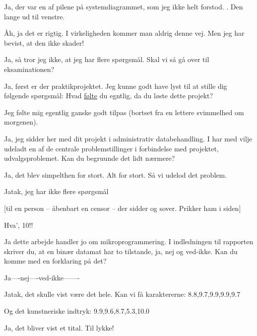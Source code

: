 \documentclass[a4paper,11pt]{article}
\begin{document}
\begin{sketch}
 Ja, der var en af pilene på systemdiagrammet, som jeg ikke helt
forstod. . Den lange ud til venstre.

 Åh, ja det er rigtig. I virkeligheden kommer man aldrig denne vej. Men
jeg har bevist, at den ikke skader!

 Ja, så tror jeg ikke, at jeg har flere spørgsmål. Skal vi så gå over
til eksaminationen?

 Ja, først er der praktikprojektet. Jeg kunne godt have lyst til at
stille dig følgende spørgsmål: Hvad \underline{følte} du egntlig, da du løste
dette projekt?

 Jeg følte mig egentlig ganske godt tilpas (bortset fra en lettere
svimmelhed om morgenen).

 Ja, jeg sidder her med dit projekt i administrativ databehandling. I
har med vilje udeladt en af de centrale problemstillinger i forbindelse med
projektet, udvalgsproblemet. Kan du begruunde det lidt nærmere?

 Ja, det blev simpelthen for stort. Alt for stort. Så vi udelod det
problem.

 Jatak, jeg har ikke flere spørgsmål

[til en person -- åbenbart en censor -- der sidder og sover. Prikker ham
i siden]

 Hva', 10!! 

 Ja dette arbejde handler jo om mikroprogrammering. I indledningen til
rapporten skriver du, at en binær datamat har to tilstande, ja, nej og
ved-ikke. Kan du komme med en forklaring på det?

 Ja----nej----ved-ikke-------

 Jatak, det skulle vist være det hele. Kan vi få karaktererne:  8.8,9.7,9.9,9.9,9.7

 Og det kunstneriske indtryk: 9.9,9.6,8.7,5.3,10.0

 Ja, det bliver vist et tital. Til lykke!


\end{sketch}
\end{document}
